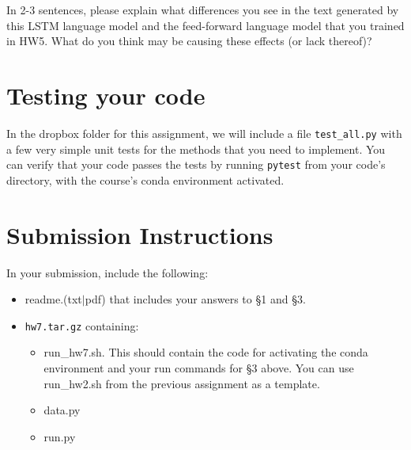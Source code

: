 \documentclass[11pt]{article}
\begin{document}
\vspace{2em}
 In 2-3 sentences, please explain what differences you see in the text generated by this LSTM language model and the feed-forward language model that you trained in HW5. What do you think may be causing these effects (or lack thereof)?


\section{Testing your code}

In the dropbox folder for this assignment, we will include a file \texttt{test\_all.py} with a few very simple unit tests for the methods that you need to implement.  You can verify that your code passes the tests by running \texttt{pytest} from your code's directory, with the course's conda environment activated.


\section*{Submission Instructions}

In your submission, include the following:
\begin{itemize}
  \item readme.(txt$\mid$pdf) that includes your answers to \S1 and \S3. 
  \item \texttt{hw7.tar.gz} containing:
  \begin{itemize}
    \item run\_hw7.sh.  This should contain the code for activating the conda environment and your run commands for \S3 above.  You can use run\_hw2.sh from the previous assignment as a template.
    \item data.py
    \item run.py
  \end{itemize}
\end{itemize}
\end{document}
